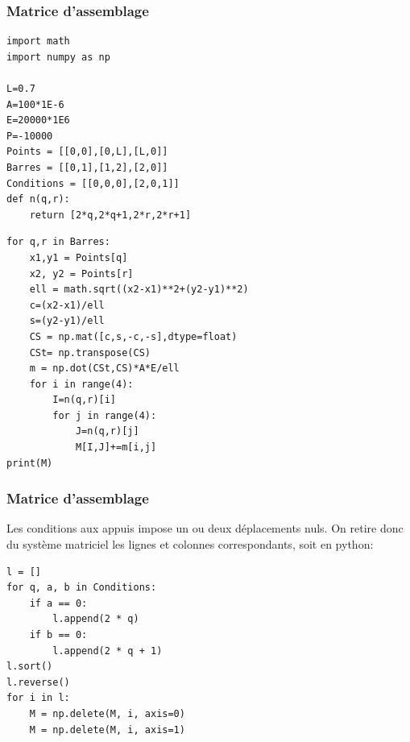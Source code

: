 \documentclass{beamer}
\begin{document}
\begin{frame}[fragile]
\frametitle{Matrice d'assemblage}
\begin{verbatim}
import math
import numpy as np

L=0.7
A=100*1E-6
E=20000*1E6
P=-10000
Points = [[0,0],[0,L],[L,0]]
Barres = [[0,1],[1,2],[2,0]]
Conditions = [[0,0,0],[2,0,1]]
def n(q,r):
    return [2*q,2*q+1,2*r,2*r+1]
\end{verbatim}
  \end{frame}

\begin{frame}[fragile]
\begin{verbatim}
for q,r in Barres:
    x1,y1 = Points[q]
    x2, y2 = Points[r]
    ell = math.sqrt((x2-x1)**2+(y2-y1)**2)
    c=(x2-x1)/ell
    s=(y2-y1)/ell
    CS = np.mat([c,s,-c,-s],dtype=float)
    CSt= np.transpose(CS)
    m = np.dot(CSt,CS)*A*E/ell
    for i in range(4):
        I=n(q,r)[i]
        for j in range(4):
            J=n(q,r)[j]
            M[I,J]+=m[i,j]
print(M)
\end{verbatim}
\end{frame}

\begin{frame}[fragile]
\frametitle{Matrice d'assemblage}
Les conditions aux appuis impose un ou deux déplacements nuls. On retire donc du système matriciel  les lignes et colonnes correspondants, soit en python:

\begin{verbatim}
l = []
for q, a, b in Conditions:
    if a == 0:
        l.append(2 * q)
    if b == 0:
        l.append(2 * q + 1)
l.sort()
l.reverse()
for i in l:
    M = np.delete(M, i, axis=0)
    M = np.delete(M, i, axis=1)
\end{verbatim}


\end{frame}
\end{document}
